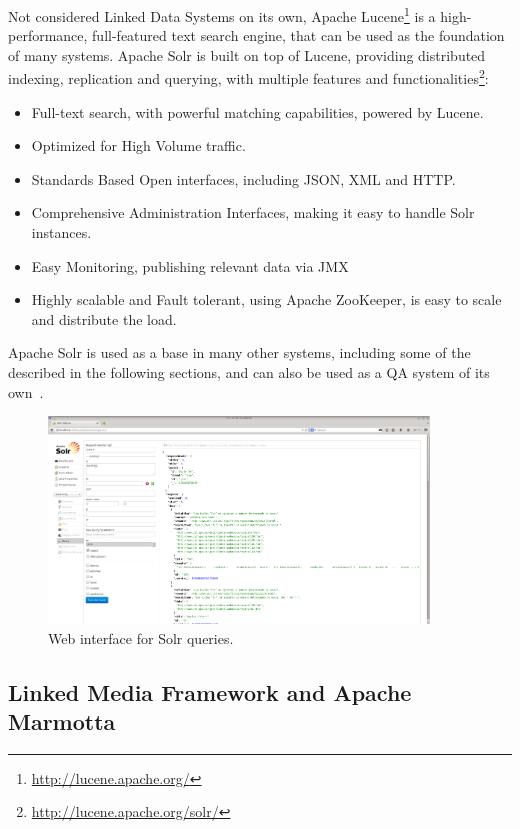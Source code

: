 Not considered Linked Data Systems on its own, Apache Lucene\footnote{\url{http://lucene.apache.org/}} is a high-performance, full-featured text search engine, that can be used as the foundation of many systems. Apache Solr is built on top of Lucene, providing distributed indexing, replication and querying, with multiple features and functionalities\footnote{\url{http://lucene.apache.org/solr/}}:

\begin{itemize}%
  \item Full-text search, with powerful matching capabilities, powered by Lucene.
  \item Optimized for High Volume traffic.
  \item Standards Based Open interfaces, including JSON, XML and HTTP.
  \item Comprehensive Administration Interfaces, making it easy to handle Solr instances.
  \item Easy Monitoring, publishing relevant data via JMX
  \item Highly scalable and Fault tolerant, using Apache ZooKeeper, is easy to scale and distribute the load.
\end{itemize}

Apache Solr is used as a base in many other systems, including some of the described in the following sections, and can also be used as a \ac{QA} system of its own~\cite{ingersoll2013taming}.

\begin{figure}[!htbp]
    \centering
    \includegraphics[width=0.9\textwidth]{img/screens/solr-interface.png}
    \caption{Web interface for Solr queries.}
    \label{fig:solr1}
\end{figure}


\subsection{Linked Media Framework and Apache Marmotta}

